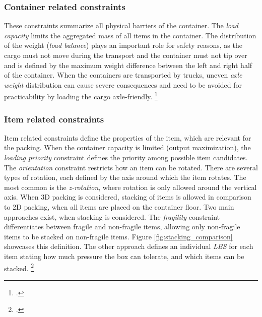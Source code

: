\subsubsection{Container related constraints}
These constraints summarize all physical barriers of the container. The \textit{load capacity} limits the aggregated
mass of all items in the container. The distribution of the weight (\textit{load balance})
plays an important role for safety reasons, as the cargo must not move during the transport and the container
must not tip over and is defined by the maximum weight difference between the left and right half of the container.
When the containers are transported by trucks, uneven \textit{axle weight} distribution can cause severe
consequences and need to be avoided for practicability by loading the cargo axle-friendly. \footcite[cf.][pp. 849--850]{krebs_advanced_2021}

\subsubsection{Item related constraints}
Item related constraints define the properties of the item, which are relevant
for the packing. When the container capacity is limited (output maximization),
the \textit{loading priority} constraint defines the priority among possible
item candidates. The \textit{orientation} constraint restricts how an item can be rotated.
There are several types of rotation, each defined by the axis around which the item rotates.
The most common is the \textit{z-rotation}, where rotation is only allowed around the vertical axis.
When 3D packing is considered, stacking of items is allowed in comparison to 2D packing, when all
items are placed on the container floor. Two main approaches exist, when stacking is considered.
The \textit{fragility} constraint differentiates between fragile and non-fragile items,
allowing only non-fragile items to be stacked on non-fragile items. Figure \ref{fig:stacking_comparison} showcases
this definition. The other approach defines an individual \textit{\gls{LBS}} for each
item stating how much pressure the box can tolerate, and which items can be stacked. \footcite[cf.][pp. 847--848]{krebs_advanced_2021}



